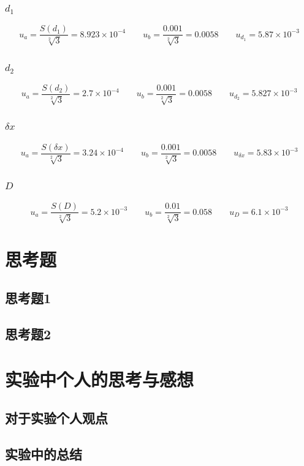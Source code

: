 \documentclass{ctexart}
\begin{document}
    \subsubsection{$d_{1}$}
    \begin{equation}
      u_{a} = \frac{S(d_{1})}{\sqrt[2]{3}}=8.923\times 10^{-4}\qquad
      u_{b} = \frac{0.001}{\sqrt[2]{3}}=0.0058\qquad
      u_{d_{1}} = 5.87\times 10^{-3}
    \end{equation}

    \subsubsection{$d_{2}$}
    \begin{equation}
      u_{a} = \frac{S(d_{2})}{\sqrt[2]{3}}=2.7\times 10^{-4}\qquad
      u_{b} = \frac{0.001}{\sqrt[2]{3}}=0.0058\qquad
      u_{d_{2}} = 5.827\times 10^{-3}
    \end{equation}

    \subsubsection{$\delta x$}
    \begin{equation}
      u_{a} = \frac{S(\delta x)}{\sqrt[2]{3}}=3.24\times 10^{-4}\qquad
      u_{b} = \frac{0.001}{\sqrt[2]{3}}=0.0058\qquad
      u_{\delta x} = 5.83\times 10^{-3}
    \end{equation}

    \subsubsection{$D$}
    \begin{equation}
      u_{a} = \frac{S(D)}{\sqrt[2]{3}}=5.2\times 10^{-3}\qquad
      u_{b} = \frac{0.01}{\sqrt[2]{3}}=0.058\qquad
      u_{D} = 6.1\times 10^{-3}
    \end{equation}
\section{思考题}
  \subsection{思考题1}


  \subsection{思考题2} 
\newpage

\section{实验中个人的思考与感想}

  \subsection{对于实验个人观点}


  \subsection{实验中的总结}
\end{document}
